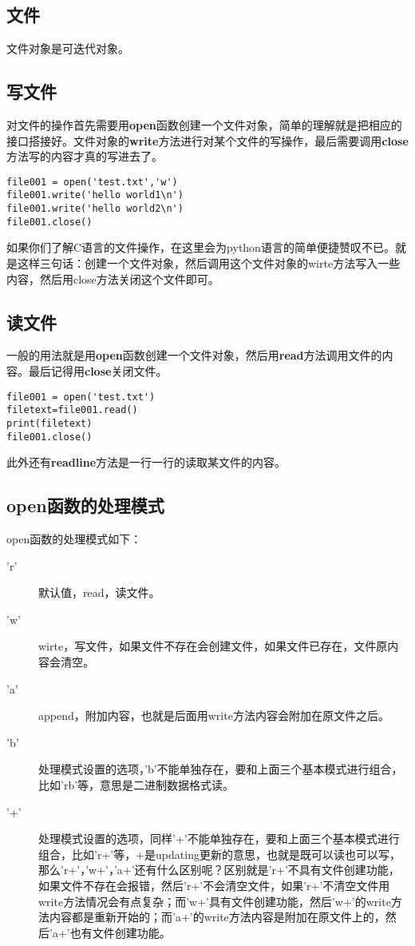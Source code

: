 \documentclass[12pt,oneside]{book}
\begin{document}
\begin{common-format}
\section{文件}
文件对象是可迭代对象。

\subsection{写文件}
对文件的操作首先需要用\textbf{open}函数创建一个文件对象，简单的理解就是把相应的接口搭接好。文件对象的\textbf{write}方法进行对某个文件的写操作，最后需要调用\textbf{close}方法写的内容才真的写进去了。

\begin{Verbatim}
file001 = open('test.txt','w')
file001.write('hello world1\n')
file001.write('hello world2\n')
file001.close()
\end{Verbatim}

如果你们了解C语言的文件操作，在这里会为python语言的简单便捷赞叹不已。就是这样三句话：创建一个文件对象，然后调用这个文件对象的wirte方法写入一些内容，然后用close方法关闭这个文件即可。


\subsection{读文件}
一般的用法就是用\textbf{open}函数创建一个文件对象，然后用\textbf{read}方法调用文件的内容。最后记得用\textbf{close}关闭文件。
\begin{Verbatim}
file001 = open('test.txt')
filetext=file001.read()
print(filetext)
file001.close()
\end{Verbatim}

此外还有\textbf{readline}方法是一行一行的读取某文件的内容。


\subsection{open函数的处理模式}
open函数的处理模式如下：
\begin{description}
\item['r'] 默认值，read，读文件。
\item['w'] wirte，写文件，如果文件不存在会创建文件，如果文件已存在，文件原内容会清空。
\item['a'] append，附加内容，也就是后面用write方法内容会附加在原文件之后。
\item['b'] 处理模式设置的选项，'b'不能单独存在，要和上面三个基本模式进行组合，比如'rb'等，意思是二进制数据格式读。
\item['+'] 处理模式设置的选项，同样'+'不能单独存在，要和上面三个基本模式进行组合，比如'r+'等，+是updating更新的意思，也就是既可以读也可以写，那么'r+'，'w+'，'a+'还有什么区别呢？区别就是'r+'不具有文件创建功能，如果文件不存在会报错，然后'r+'不会清空文件，如果'r+'不清空文件用write方法情况会有点复杂；而'w+'具有文件创建功能，然后'w+'的write方法内容都是重新开始的；而'a+'的write方法内容是附加在原文件上的，然后'a+'也有文件创建功能。
\end{description}




\end{common-format}
\end{document}
